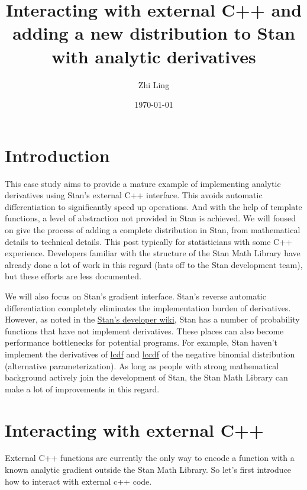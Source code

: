 \documentclass[11pt]{article}
\title{Interacting with external C++ and adding a new distribution to Stan with analytic derivatives}
\author{Zhi Ling}
\date{\today}
\begin{document}
\maketitle


\section{Introduction}

This case study aims to provide a mature example of implementing analytic derivatives using Stan's external C++ interface. This avoids automatic differentiation to significantly speed up operations. And with the help of template functions, a level of abstraction not provided in Stan is achieved. We will foused on give the process of adding a complete distribution in Stan, from mathematical details to technical details. This post typically for statisticians with some C++ experience. Developers familiar with the structure of the Stan Math Library have already done a lot of work in this regard (hats off to the Stan development team), but these efforts are less documented.


We will also focus on Stan's gradient interface. Stan's reverse automatic differentiation completely eliminates the implementation burden of derivatives. However, as noted in the \href{https://github.com/stan-dev/stan/wiki/Contributing-to-Stan-Without-C-Plus-Plus--Experience}{Stan's developer wiki}, Stan has a number of probability functions that have not implement derivatives. These places can also become performance bottlenecks for potential programs. For example, Stan haven't implement the derivatives of \href{https://github.com/stan-dev/math/blob/develop/stan/math/prim/prob/neg_binomial_2_lcdf.hpp}{lcdf} and \href{https://github.com/stan-dev/math/blob/develop/stan/math/prim/prob/neg_binomial_2_lccdf.hpp}{lccdf} of the negative binomial distribution (alternative parameterization). As long as people with strong mathematical background actively join the development of Stan, the Stan Math Library can make a lot of improvements in this regard.




\section{Interacting with external C++}

External C++ functions are currently the only way to encode a function with a known analytic gradient outside the Stan Math Library. So let’s first introduce how to interact with external c++ code.
\end{document}
